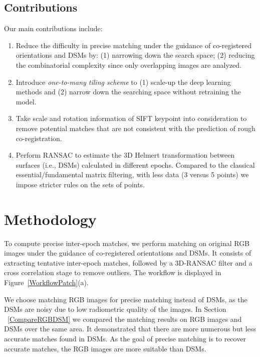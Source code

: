 \subsection{Contributions}
Our main contributions include:\\
\begin{enumerate}
	\item Reduce the difficulty in precise matching under the guidance of co-registered orientations and DSMs by: (1) narrowing down the search space; (2) reducing the combinatorial complexity since only overlapping images are analyzed.
	\item Introduce \textit{one-to-many tiling scheme} to (1) scale-up the deep learning methods and (2) narrow down the searching space without retraining the model.
	\item Take scale and rotation information of SIFT keypoint into consideration to remove potential matches that are not consistent with the prediction of rough co-registration.
	\item Perform RANSAC to estimate the 3D Helmert transformation between surfaces (i.e., DSMs) calculated in different epochs. Compared to the classical essential/fundamental matrix filtering, with less data (3 versus 5 points) we impose stricter rules on the sets of points. 
\end{enumerate}

\section{Methodology}
To compute precise {inter-epoch} matches, we perform matching on original RGB images {under the guidance of co-registered orientations and DSMs}. {It consists of extracting tentative inter-epoch matches, followed by a 3D-RANSAC filter and a cross correlation stage to remove outliers.} The workflow is displayed in Figure~\ref{WorkflowPatch}(a).
\par
We choose matching RGB images for precise matching instead of DSMs, as the DSMs are noisy due to low radiometric quality of the images. In Section ~\ref{CompareRGBDSM} %
we compared the matching results on RGB images and DSMs over the same area. It demonstrated that there are more numerous but less accurate matches found in DSMs. As the goal of precise matching is to recover accurate matches, the RGB images are more suitable than DSMs.\\

